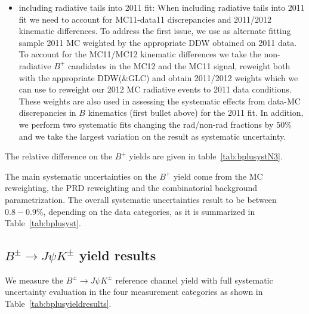 \begin{itemize}
    \item including radiative tails into 2011 fit: When including radiative tails into 2011 fit
	we need to account for MC11-data11 discrepancies and 2011/2012 kinematic differences.
	To address the first issue, we use as alternate fitting sample 2011 MC weighted by the
	appropriate DDW obtained on 2011 data.
	To account for the MC11/MC12 kinematic differences we take the non-radiative $B^+$ candidates
	in the MC12 and the MC11 \BpmKpmJpsi{} signal, reweight both with the appropriate DDW(\&GLC) and obtain
	2011/2012 weights which we can use to reweight our 2012 MC radiative events to 2011 data
	conditions. These weights are also used in assessing the systematic effects from data-MC
	discrepancies in $B$ kinematics (first bullet above) for the 2011 fit.
	In addition, we perform two systematic fits changing the rad/non-rad fractions
	by $50\%$ and we take the largest variation on the result as systematic
	uncertainty.

\end{itemize}

The relative difference on the $B^+$ yields are given in table~\ref{tab:bplusystN3}. 

The main systematic uncertainties on the $B^+$ yield come from the
MC reweighting, the PRD reweighting and the combinatorial background
parametrization. The overall systematic uncertainties result to be
between $0.8-0.9\%$, depending on the data categories, as it is summarized
in Table~\ref{tab:bplusyst}.

\begin{table}[!htb]
    \begin{center}
	\label{tab:bplusystN3}
    \end{center}
\end{table}

\begin{table}[!htb]
    \begin{center}
	\label{tab:bplusyst}
    \end{center}
\end{table}

\subsection{$B^{\pm} \rightarrow J\psi K^{\pm}$ yield results}

We measure the $B^{\pm} \rightarrow J\psi K^{\pm}$ reference channel yield with full
systematic uncertainty evaluation in the four measurement categories as shown in
Table~\ref{tab:bplusyieldresults}.

